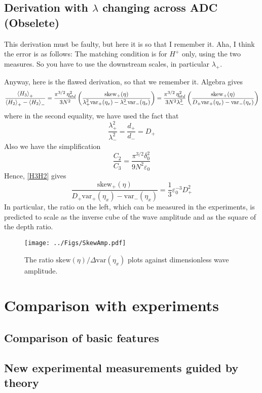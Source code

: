 \documentclass[11pt]{article}
\newcommand{\vsp}[1]{\vspace{#1 pc} \noindent}
\newcommand{\mean}[1]{\left< #1 \right>}
\newcommand{\eps}{\varepsilon}
\newcommand{\etastd}{\eta_{\text std}}
\newcommand{\depth}{d}
\newcommand{\dup}{\depth_{-}}
\newcommand{\ddn}{\depth_{+}}
\newcommand{\lam}{\lambda}
\newcommand{\lamup}{\lam_{-}}
\newcommand{\lamdn}{\lam_{+}}
\newcommand{\lamfac}{N}
\newcommand{\drat}{D}
\newcommand{\dratdn}{\drat_+}
\newcommand{\skw}{\text{skew}}
\newcommand{\skwdn}{\skw_+}
\newcommand{\var}{\text{var}}
\newcommand{\varup}{\var_-}
\newcommand{\vardn}{\var_+}
\newcommand{\epsup}{\eps_0}
\newcommand{\delup}{\delta_0}
\newcommand{\Ham}{H}
\newcommand{\Hdn}{\Ham^{+}}
\newcommand{\meanup}[1]{\mean{#1}_{-}}
\newcommand{\meandn}[1]{\mean{#1}_{+}}
\begin{document}
\subsection{Derivation with $\lam$ changing across ADC (Obselete)}
This derivation must be faulty, but here it is so that I remember it.
Aha, I think the error is as follows: The matching condition is for $\Hdn$ only, using the two measures. So you have to use the downstream scales, in particular $\lamdn$. 

\vsp{1}
Anyway, here is the flawed derivation, so that we remember it.
Algebra gives
\begin{equation}
\frac{\meandn{H_3}} {\meandn{H_2} - \meanup{H_2}} = 
\frac{\pi^{3/2} \, \etastd^2} {3 \lamfac^2} 
\left( \frac{\skwdn(\eta)}{ \lamdn^2 \vardn(\eta_x) - \lamup^2 \varup(\eta_x)} \right) = 
\frac{\pi^{3/2} \, \etastd^2} {3 \lamfac^2 \lamup^2} 
\left( \frac{\skwdn(\eta)} {\dratdn \vardn(\eta_x) - \varup(\eta_x)} \right)
\end{equation}
where in the second equality, we have used the fact that
\begin{equation}
\frac{\lamdn^2}{\lamup^2} = \frac{\ddn}{\dup} = \dratdn
\end{equation}
Also we have the simplification
\begin{equation}
\frac{C_2}{C_3} = \frac{\pi^{3/2} \delup^2}{9 \lamfac^2 \epsup}
\end{equation}
Hence, \eqref{H3H2} gives
\begin{equation}
\frac{\skwdn(\eta)} {\dratdn \vardn(\eta_x) - \varup(\eta_x)} = \frac{1}{3} \epsup^{-3} \dratdn^2
\end{equation}
In particular, the ratio on the left, which can be measured in the experiments, is predicted to scale as the inverse cube of the wave amplitude and as the square of the depth ratio.

\begin{figure}%
\begin{center}
\texttt{[image: ../Figs/SkewAmp.pdf]}
\caption{\label{fig1} 
The ratio ${\skw(\eta)}/{\Delta \var(\eta_x)}$ plots against dimensionless wave amplitude.
}
\end{center}
\end{figure}



\section{Comparison with experiments}

\subsection{Comparison of basic features}

\subsection{New experimental measurements guided by theory}

%
%
\end{document}
